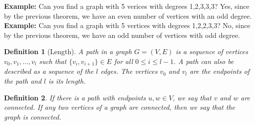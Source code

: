 \documentclass[openany]{report}
\newtheorem{definition}{Definition}[section]
\begin{document}
\noindent
\textbf{Example:} Can you find a graph with 5 verices with degrees 1,2,3,3,3? Yes, since by the previous theorem, we have an even number of vertices with an odd degree. \\[3ex]
\noindent
\textbf{Example:} Can you find a graph with 5 vertices with degrees 1,2,2,3,3? No, since by the previous theorem, we have an odd number of vertices with odd degree. 
\begin{definition}[Length]
    A \emph{path} in a graph $G = (V,E)$ is a sequence of vertices $v_0, v_1, \ldots, v_l$ such that $\{v_i,v_{i+1}\} \in E$ for all $0 \leq i \leq l-1$. A path can also be described as a sequence of the $l$ edges. The vertices $v_0$ and $v_l$ are the \emph{endpoints} of the path and $l$ is its \emph{length}.
\end{definition}
\begin{definition}
    If there is a path with endpoints $u,w \in V$, we say that $v$ and $w$ are \emph{connected}. If any two vertices of a graph are connected, then we say that the graph is \emph{connected}.
\end{definition}


\setcounter{chapter}{19}

\end{document}
